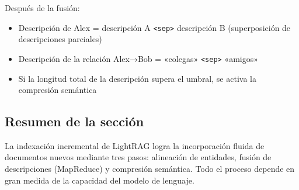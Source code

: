 Después de la fusión:
\begin{itemize}
    \item Descripción de Alex = descripción A \texttt{<sep>} descripción B (superposición de descripciones parciales)
    \item Descripción de la relación Alex→Bob = «colegas» \texttt{<sep>} «amigos»
    \item Si la longitud total de la descripción supera el umbral, se activa la compresión semántica
\end{itemize}

\subsection{Resumen de la sección}

La indexación incremental de LightRAG logra la incorporación fluida de documentos nuevos mediante tres pasos: alineación de entidades, fusión de descripciones (MapReduce) y compresión semántica. Todo el proceso depende en gran medida de la capacidad del modelo de lenguaje.
